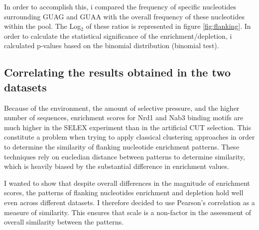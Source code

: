 In order to accomplish this, i compared the frequency of specific nucleotides surrounding GUAG and GUAA with the overall frequency of these nucleotides within the pool. 
The Log$_2$ of these ratios is represented in figure \ref{fig:flanking}. 
In order to calculate the statistical significance of the enrichment/depletion, i calculated p-values based on the binomial distribution (binomial test).

\subsection*{Correlating the results obtained in the two datasets}

Because of the environment, the amount of selective pressure, and the higher number of sequences, enrichment scores for Nrd1 and Nab3 binding motifs are much higher in the SELEX experiment than in the artificial CUT selection. This constitute a problem when trying to apply classical clustering approaches in order to determine the similarity of flanking nucleotide enrichment patterns. These techniques rely on eucledian distance between patterns to determine similarity, which is heavily biased by the substantial difference in enrichment values.

I wanted to show that despite overall differences in the magnitude of enrichment scores, the patterns of flanking nucleotides enrichment and depletion hold well even across different datasets. I therefore decided to use Pearson's correlation as a measure of similarity. This ensures that scale is a non-factor in the assessment of overall similarity between the patterns.